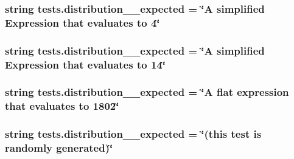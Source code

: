 \subsubsection[{distribution\+\_\+2\+\_\+expected}]{\setlength{\rightskip}{0pt plus 5cm}string tests.\+distribution\+\_\+\_\+expected = \char`\"{}A simplified {\bf Expression} that evaluates to 4\char`\"{}}\label{namespacetests_a1697cfb257a399ad17adc3d1416b835b}
\hypertarget{namespacetests_a9a4fd4037ef869ed070a1cbe27ffd548}{}
\subsubsection[{distribution\+\_\+3\+\_\+expected}]{\setlength{\rightskip}{0pt plus 5cm}string tests.\+distribution\+\_\+\_\+expected = \char`\"{}A simplified {\bf Expression} that evaluates to \textquotesingle{}14\textquotesingle{}\char`\"{}}\label{namespacetests_a9a4fd4037ef869ed070a1cbe27ffd548}
\hypertarget{namespacetests_aac9d9c1112c89b1661fc020d30021881}{}
\subsubsection[{distribution\+\_\+4\+\_\+expected}]{\setlength{\rightskip}{0pt plus 5cm}string tests.\+distribution\+\_\+\_\+expected = \char`\"{}A flat expression that evaluates to 1802\char`\"{}}\label{namespacetests_aac9d9c1112c89b1661fc020d30021881}
\hypertarget{namespacetests_a02c918ab521f2c6887c6a77b04d346b5}{}
\subsubsection[{distribution\+\_\+5\+\_\+expected}]{\setlength{\rightskip}{0pt plus 5cm}string tests.\+distribution\+\_\+\_\+expected = \char`\"{}(this test is randomly generated)\char`\"{}}\label{namespacetests_a02c918ab521f2c6887c6a77b04d346b5}
\hypertarget{namespacetests_a47b204c4e788c5641d2766790e212c43}{}
